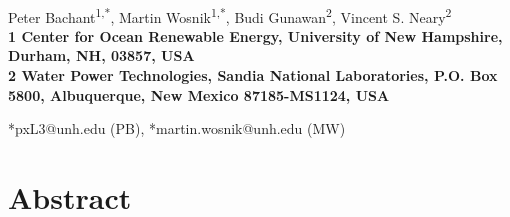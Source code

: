 \documentclass[10pt,letterpaper]{article}
\date{}
\begin{document}
\linenumbers
\vspace*{0.35in}

\begin{flushleft}

{\Large \textbf{}} \newline %
\\ Peter Bachant\textsuperscript{1,*}, Martin Wosnik\textsuperscript{1,*}, Budi
Gunawan\textsuperscript{2}, Vincent S. Neary\textsuperscript{2} \\ \bigskip
\bf{1} Center for Ocean Renewable Energy, University of New Hampshire, Durham,
NH, 03857, USA \\ \bf{2} Water Power Technologies, Sandia National Laboratories,
P.O. Box 5800, Albuquerque, New Mexico 87185-MS1124, USA \\ \bigskip

*pxL3@unh.edu (PB), *martin.wosnik@unh.edu (MW) 

\end{flushleft}

\section*{Abstract}
\end{document}
